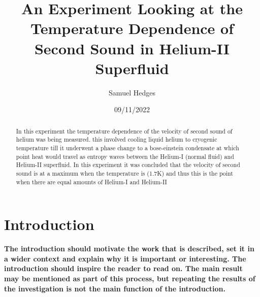 \documentclass[a4paper,11pt]{article}
\begin{document}
\begin{figure}
\leftline{\hfill }
\end{figure}




\title{An Experiment Looking at the Temperature Dependence of Second Sound in Helium-II Superfluid}
\author{Samuel Hedges}
\date{09/11/2022}
 \maketitle
 \newpage
\begin{abstract}
In this experiment the temperature dependence of the velocity of second sound of helium was being measured. this involved cooling liquid helium to cryogenic temperature till it underwent a phase change to a bose-einstein condensate at which point heat would travel as entropy waves between the Helium-I (normal fluid) and Helium-II superfluid. In this experiment it was concluded that the velocity of second sound is at a maximum when the temperature is (\appox 1.7K) and thus this is the point when there are equal amounts of Helium-I and Helium-II
\end{abstract}
 \newpage
 \tableofcontents
\newpage

\section{Introduction}
\textbf{The introduction should motivate the work that is described, set it in a wider context and explain why it is important or interesting. The introduction should inspire the reader to read on. The main result may be mentioned as part of this process, but repeating the results of the investigation is not the main function of the introduction.}
\\

\\
\end{document}
